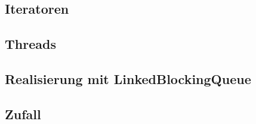 \subsection{Iteratoren} %
\label{sub:iterators}


\subsection{Threads} %
\label{sub:die_klasse_thread}


\subsection{Realisierung mit LinkedBlockingQueue} %
\label{sub:realisierung_mit_linkedblockingqueue}


\subsection{Zufall} %
\label{sub:zufall}



